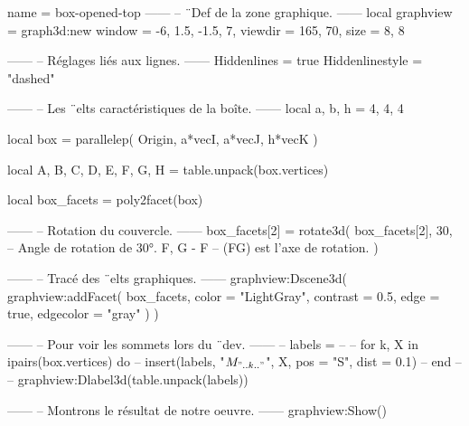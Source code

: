 \documentclass{standalone}
\begin{document}
\begin{luadraw}{name = box-opened-top}
------
-- ¨Def de la zone graphique.
------
local graphview = graph3d:new{
  window  = {-6, 1.5, -1.5, 7},
  viewdir = {165, 70},
  size    = {8, 8}
}

------
-- Réglages liés aux lignes.
------
Hiddenlines     = true
Hiddenlinestyle = "dashed"

------
-- Les ¨elts caractéristiques de la boîte.
------
local a, b, h = 4, 4, 4

local box = parallelep(
  Origin,
  a*vecI, a*vecJ, h*vecK
)

local A, B, C, D, E, F, G, H = table.unpack(box.vertices)

local box_facets = poly2facet(box)

------
-- Rotation du couvercle.
------
box_facets[2] = rotate3d(
  box_facets[2],
  30,         -- Angle de rotation de 30°.
  {F, G - F}  -- (FG) est l'axe de rotation.
)

------
-- Tracé des ¨elts graphiques.
------
graphview:Dscene3d(
  graphview:addFacet(
    box_facets,
    {
      color     = "LightGray",
      contrast  = 0.5,
      edge      = true,
      edgecolor = "gray"
    }
  )
)

------
-- Pour voir les sommets lors du ¨dev.
------
-- labels = {}
--
-- for k, X in ipairs(box.vertices) do
--   insert(labels, {"$M_{".. k .."}$", X, {pos = "S", dist = 0.1}})
-- end
--
-- graphview:Dlabel3d(table.unpack(labels))

------
-- Montrons le résultat de notre oeuvre.
------
graphview:Show()
\end{luadraw}
\end{document}
